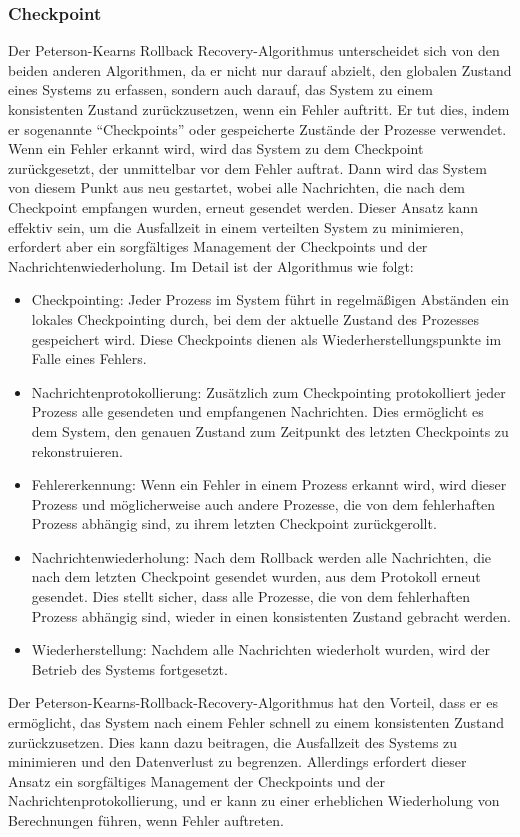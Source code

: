 \subsubsection{Checkpoint}
Der Peterson-Kearns Rollback Recovery-Algorithmus unterscheidet sich von den beiden anderen Algorithmen, da er nicht nur darauf abzielt, den globalen Zustand eines Systems zu erfassen, sondern auch darauf, das System zu einem konsistenten Zustand zurückzusetzen, wenn ein Fehler auftritt. Er tut dies, indem er sogenannte \enquote{Checkpoints} oder gespeicherte Zustände der Prozesse verwendet. Wenn ein Fehler erkannt wird, wird das System zu dem Checkpoint zurückgesetzt, der unmittelbar vor dem Fehler auftrat. Dann wird das System von diesem Punkt aus neu gestartet, wobei alle Nachrichten, die nach dem Checkpoint empfangen wurden, erneut gesendet werden. Dieser Ansatz kann effektiv sein, um die Ausfallzeit in einem verteilten System zu minimieren, erfordert aber ein sorgfältiges Management der Checkpoints und der Nachrichtenwiederholung.
Im Detail ist der Algorithmus wie folgt:
\begin{itemize}
\item Checkpointing: Jeder Prozess im System führt in regelmäßigen Abständen ein lokales Checkpointing durch, bei dem der aktuelle Zustand des Prozesses gespeichert wird. Diese Checkpoints dienen als Wiederherstellungspunkte im Falle eines Fehlers.
\item Nachrichtenprotokollierung: Zusätzlich zum Checkpointing protokolliert jeder Prozess alle gesendeten und empfangenen Nachrichten. Dies ermöglicht es dem System, den genauen Zustand zum Zeitpunkt des letzten Checkpoints zu rekonstruieren.
\item Fehlererkennung: Wenn ein Fehler in einem Prozess erkannt wird, wird dieser Prozess und möglicherweise auch andere Prozesse, die von dem fehlerhaften Prozess abhängig sind, zu ihrem letzten Checkpoint zurückgerollt.
\item Nachrichtenwiederholung: Nach dem Rollback werden alle Nachrichten, die nach dem letzten Checkpoint gesendet wurden, aus dem Protokoll erneut gesendet. Dies stellt sicher, dass alle Prozesse, die von dem fehlerhaften Prozess abhängig sind, wieder in einen konsistenten Zustand gebracht werden.
\item Wiederherstellung: Nachdem alle Nachrichten wiederholt wurden, wird der Betrieb des Systems fortgesetzt.
\end{itemize}
Der Peterson-Kearns-Rollback-Recovery-Algorithmus hat den Vorteil, dass er es ermöglicht, das System nach einem Fehler schnell zu einem konsistenten Zustand zurückzusetzen. Dies kann dazu beitragen, die Ausfallzeit des Systems zu minimieren und den Datenverlust zu begrenzen. Allerdings erfordert dieser Ansatz ein sorgfältiges Management der Checkpoints und der Nachrichtenprotokollierung, und er kann zu einer erheblichen Wiederholung von Berechnungen führen, wenn Fehler auftreten.


